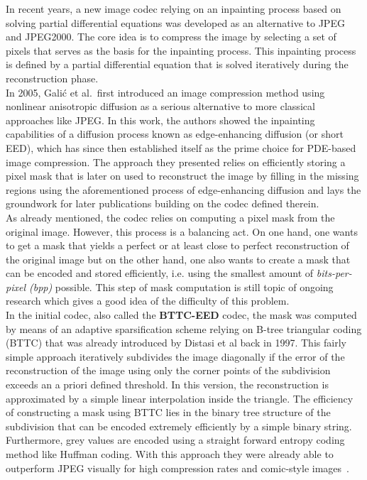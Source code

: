 In recent years, a new image codec relying on an inpainting process based on solving partial
differential equations was developed as an
alternative to JPEG and JPEG2000. The core idea is to compress the image by selecting a set of
pixels that serves as the basis for the inpainting process. This inpainting process is defined by a
partial differential equation that is solved iteratively during the reconstruction phase.\\
In 2005, Galić et al.\cite{galic05}\ first introduced an image compression method using nonlinear
anisotropic diffusion
 as a serious alternative to more classical approaches like JPEG. In this
work, the authors showed the inpainting capabilities of a diffusion process known as edge-enhancing
diffusion (or short EED), which has since then established itself as the prime choice for PDE-based image
compression. The approach they presented relies on efficiently storing a pixel mask that is later
on used to reconstruct the image by filling in the missing regions using the aforementioned process
of edge-enhancing diffusion and lays the groundwork for later publications building on the codec
defined therein. \\
As already mentioned, the codec relies on computing a pixel mask from the original image. However,
this process is a balancing act. On one hand, one wants to get a mask that yields a perfect
or at least close to perfect reconstruction of the original image but on the other hand, one 
also wants to create a mask that
can be encoded and stored efficiently, i.e. using the smallest amount of \textit{bits-per-pixel
(bpp)} possible. This step of mask computation is still topic of ongoing research which gives a
good idea of the difficulty of this problem.\\
In the initial codec, also called the \textbf{BTTC-EED} codec, the mask was
computed by means of an adaptive sparsification scheme relying on B-tree triangular coding (BTTC)
that was already introduced by Distasi et al\cite{distasi97} back in 1997. This fairly simple
approach iteratively subdivides the image diagonally if the error of the reconstruction of the image using only
the corner points of the subdivision exceeds an a priori defined threshold. In this version, the
reconstruction is approximated by a simple linear interpolation inside the triangle. The efficiency
of constructing a mask using BTTC lies in the binary tree structure of the subdivision that can be encoded extremely
efficiently by a simple binary string. Furthermore, grey values are encoded using a straight
forward entropy
coding method like Huffman coding\cite{huffman}.
With this approach they were already able to outperform JPEG visually for high
compression rates and comic-style images~\cite{galic05}.\\

